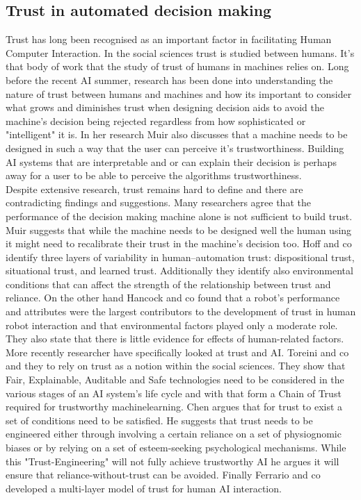 \documentclass[manuscript,screen,review]{acmart}
\begin{document}
\subsection{Trust in automated decision making}\label{subsec:trust}
Trust has long been recognised as an important factor in facilitating Human Computer Interaction\cite{Lee2008}.
In the social sciences trust is studied between humans.
It's that body of work that the study of trust of humans in machines relies on.
Long before the recent AI summer, research has been done into understanding the nature of trust between humans and machines
and how its important to consider what grows and diminishes trust when designing decision aids to avoid the machine's
decision being rejected regardless from how sophisticated or "intelligent" it is.\cite{Muir1987}
In her research Muir also discusses that a machine needs to be designed in such a way that the user can perceive it's trustworthiness\cite{Muir1987}.
Building AI systems that are interpretable and or can explain their decision is perhaps away for a user to be able to perceive
the algorithms trustworthiness.\\
Despite extensive research, trust remains hard to define and there are contradicting findings and suggestions.
Many researchers agree that the performance of the decision making machine alone is not sufficient to build trust.
Muir suggests that while the machine needs to be designed well the human using it might need to recalibrate their
trust in the machine's decision too\cite{Muir1987}.
Hoff and co identify three layers of variability in human–automation trust: dispositional trust, situational trust, and learned trust.
Additionally they identify also environmental conditions that can affect the strength of the relationship between trust and reliance\cite{Hoff2015}.
On the other hand Hancock and co found that a robot's performance and attributes were the largest contributors to the development of trust in human robot interaction and that environmental factors played only a moderate role.
They also state that there is little evidence for effects of human-related factors\cite{Hancock2011}.\\
More recently researcher have specifically looked at trust and AI.
Toreini and co and they to rely on trust as a notion within the social sciences.
They show that Fair, Explainable, Auditable and Safe technologies need to be considered in the
various stages of an AI system's life cycle and with that form a Chain of Trust required for trustworthy machinelearning\cite{Toreini2020}.
Chen argues that for trust to exist a set of conditions need to be satisfied.
He suggests that trust needs to be engineered either through involving a certain reliance on a set of physiognomic biases or by relying on a set of esteem-seeking psychological mechanisms.
While this "Trust-Engineering" will not fully achieve trustworthy AI he argues it will ensure that reliance-without-trust can be avoided\cite{Chen2021}.
Finally Ferrario and co developed a multi-layer model of trust for human AI interaction\cite{Ferrario2020}.
\end{document}
